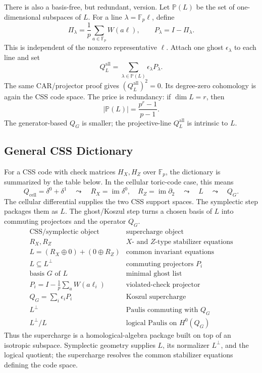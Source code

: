 There is also a basis-free, but redundant, version. Let \(\mathbb P(L)\) be
the set of one-dimensional subspaces of \(L\). For a line
\(\lambda=\mathbb F_p\ell\), define
\[
  \Pi_\lambda=\frac1p\sum_{a\in\mathbb F_p}W(a\ell),
  \qquad
  P_\lambda=I-\Pi_\lambda .
\]
This is independent of the nonzero representative \(\ell\). Attach one ghost
\(\epsilon_\lambda\) to each line and set
\[
  Q_L^{\mathrm{all}}
  =
  \sum_{\lambda\in\mathbb P(L)}\epsilon_\lambda P_\lambda .
\]
The same CAR/projector proof gives \((Q_L^{\mathrm{all}})^2=0\). Its
degree-zero cohomology is again the CSS code space. The price is redundancy:
if \(\dim L=r\), then
\[
  |\mathbb P(L)|=\frac{p^r-1}{p-1}.
\]
The generator-based \(Q_G\) is smaller; the projective-line \(Q_L^{\mathrm{all}}\)
is intrinsic to \(L\).

\subsection{General CSS Dictionary}

For a CSS code with check matrices \(H_X,H_Z\) over \(\mathbb F_p\), the
dictionary is summarized by the table below. In the cellular toric-code case,
this means
\[
  Q_{\mathrm{cell}}=\delta^0+\delta^1
  \quad\leadsto\quad
  R_X=\operatorname{im}\delta^0,\quad R_Z=\operatorname{im}\partial_2
  \quad\leadsto\quad
  L\quad\leadsto\quad Q_G .
\]
The cellular differential supplies the two CSS support spaces. The symplectic
step packages them as \(L\). The ghost/Koszul step turns a chosen basis of \(L\)
into commuting projectors and the operator \(Q_G\).
\[
\begin{array}{c|c}
\text{CSS/symplectic object} & \text{supercharge object}\\
\hline
R_X,R_Z & X\text{- and }Z\text{-type stabilizer equations}\\
L=(R_X\oplus0)+(0\oplus R_Z) & \text{common invariant equations}\\
L\subseteq L^\perp & \text{commuting projectors }P_i\\
\text{basis }G\text{ of }L & \text{minimal ghost list}\\
P_i=I-\frac1p\sum_aW(a\ell_i) & \text{violated-check projector}\\
Q_G=\sum_i\epsilon_iP_i & \text{Koszul supercharge}\\
L^\perp & \text{Paulis commuting with }Q_G\\
L^\perp/L & \text{logical Paulis on }H^0(Q_G)
\end{array}
\]
Thus the supercharge is a homological-algebra package built on top of an
isotropic subspace. Symplectic geometry supplies \(L\), its normalizer
\(L^\perp\), and the logical quotient; the supercharge resolves the common
stabilizer equations defining the code space.

